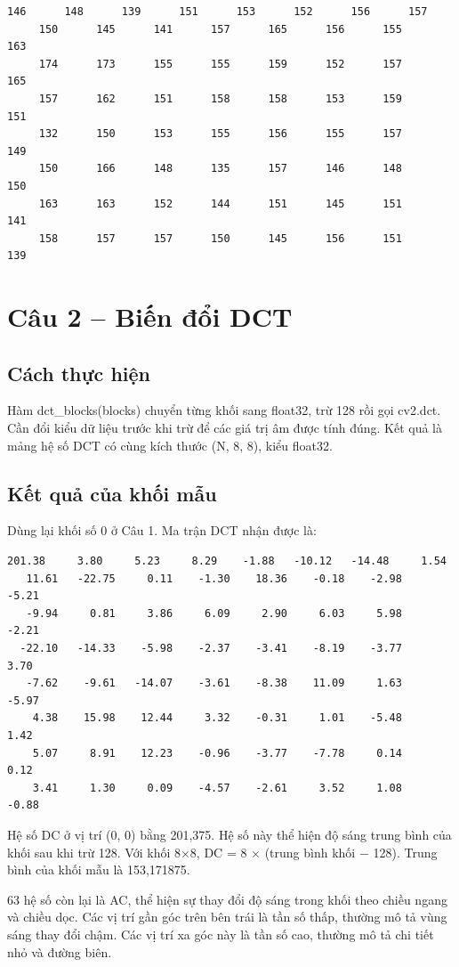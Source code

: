 \begin{Verbatim}[fontsize=\scriptsize]
     146      148      139      151      153      152      156      157
     150      145      141      157      165      156      155      163
     174      173      155      155      159      152      157      165
     157      162      151      158      158      153      159      151
     132      150      153      155      156      155      157      149
     150      166      148      135      157      146      148      150
     163      163      152      144      151      145      151      141
     158      157      157      150      145      156      151      139
\end{Verbatim}
\section{Câu 2 – Biến đổi DCT}
\subsection{Cách thực hiện}
Hàm dct\_blocks(blocks) chuyển từng khối sang float32, trừ 128 rồi gọi cv2.dct. Cần đổi kiểu dữ liệu trước khi trừ để các giá trị âm được tính đúng. Kết quả là mảng hệ số DCT có cùng kích thước (N, 8, 8), kiểu float32.

\clearpage
\subsection{Kết quả của khối mẫu}
Dùng lại khối số 0 ở Câu 1. Ma trận DCT nhận được là:

\begin{Verbatim}[fontsize=\scriptsize]
  201.38     3.80     5.23     8.29    -1.88   -10.12   -14.48     1.54
   11.61   -22.75     0.11    -1.30    18.36    -0.18    -2.98    -5.21
   -9.94     0.81     3.86     6.09     2.90     6.03     5.98    -2.21
  -22.10   -14.33    -5.98    -2.37    -3.41    -8.19    -3.77     3.70
   -7.62    -9.61   -14.07    -3.61    -8.38    11.09     1.63    -5.97
    4.38    15.98    12.44     3.32    -0.31     1.01    -5.48     1.42
    5.07     8.91    12.23    -0.96    -3.77    -7.78     0.14     0.12
    3.41     1.30     0.09    -4.57    -2.61     3.52     1.08    -0.88
\end{Verbatim}
Hệ số DC ở vị trí (0, 0) bằng 201,375. Hệ số này thể hiện độ sáng trung bình của khối sau khi trừ 128. Với khối 8×8, DC = 8 × (trung bình khối − 128). Trung bình của khối mẫu là 153,171875.

63 hệ số còn lại là AC, thể hiện sự thay đổi độ sáng trong khối theo chiều ngang và chiều dọc. Các vị trí gần góc trên bên trái là tần số thấp, thường mô tả vùng sáng thay đổi chậm. Các vị trí xa góc này là tần số cao, thường mô tả chi tiết nhỏ và đường biên.

